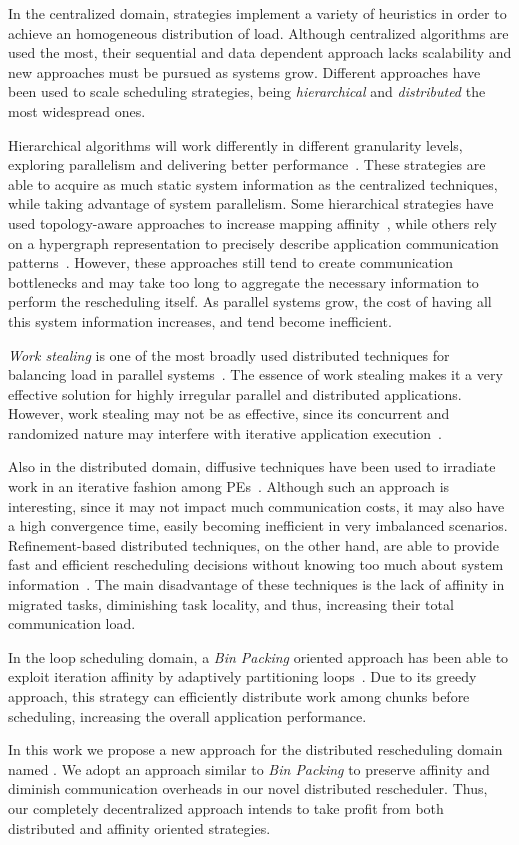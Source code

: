 In the centralized domain, strategies implement a variety of heuristics in order to achieve an homogeneous distribution of load.
Although centralized algorithms are used the most, their sequential and data dependent approach lacks scalability and new approaches must be pursued as systems grow.
Different approaches have been used to scale scheduling strategies, being \textit{hierarchical} and \textit{distributed} the most widespread ones.


Hierarchical algorithms will work differently in different granularity levels, exploring parallelism and delivering better performance~\cite{hybrid}.
These strategies are able to acquire as much static system information as the centralized techniques, while taking advantage of system parallelism.
Some hierarchical strategies have used topology-aware approaches to increase mapping affinity~\cite{hwtopo,Jeannot2016topo}, while others rely on a hypergraph representation to precisely describe application communication patterns~\cite{ZoltanParHypRepart07}.
However, these approaches still tend to create communication bottlenecks and may take too long to aggregate the necessary information to perform the rescheduling itself.
As parallel systems grow, the cost of having all this system information increases, and tend become inefficient.

\textit{Work stealing} is one of the most broadly used distributed techniques for balancing load in parallel systems~\cite{Yang18wssurvey,Janjic2013}.
The essence of work stealing makes it a very effective solution for highly irregular parallel and distributed applications.
However, work stealing may not be as effective, since its concurrent and randomized nature may interfere with iterative application execution~\cite{Beri2015hetws}.

Also in the distributed domain, diffusive techniques have been used to irradiate work in an iterative fashion among PEs~\cite{diffus}.
Although such an approach is interesting, since it may not impact much communication costs, it may also have a high convergence time, easily becoming inefficient in very imbalanced scenarios.
Refinement-based distributed techniques, on the other hand, are able to provide fast and efficient rescheduling decisions without knowing too much about system information~\cite{grapevine}.
The main disadvantage of these techniques is the lack of affinity in migrated tasks, diminishing task locality, and thus, increasing their total communication load.

In the loop scheduling domain, a \textit{Bin Packing} oriented approach has been able to exploit iteration affinity by adaptively partitioning loops~\cite{Castro-Penna-WSCAD:2017}.
Due to its greedy approach, this strategy can efficiently distribute work among chunks before scheduling, increasing the overall application performance.

In this work we propose a new approach for the distributed rescheduling domain named \packdrop.
We adopt an approach similar to \textit{Bin Packing} to preserve affinity and diminish communication overheads in our novel distributed rescheduler.
Thus, our completely decentralized approach intends to take profit from both distributed and affinity oriented strategies.